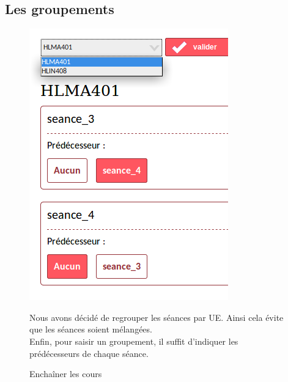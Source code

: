 \documentclass[12pt,a4paper,openany]{memoir}
\begin{document}
\subsection{Les groupements}
\begin{figure}[H]
   \begin{minipage}{0.3\linewidth}
      \includegraphics[scale=0.4]{img/interfaces/groupement.png}
      \caption{Enchaîner les cours}
   \end{minipage} \hfill
   \begin{minipage}[c]{0.65\linewidth}
    Nous avons décidé de regrouper les séances par UE. Ainsi cela évite que les séances soient mélangées. \\
    Enfin, pour saisir un groupement, il suffit d'indiquer les prédécesseurs de chaque séance. 
   \end{minipage}
\end{figure}
\end{document}
